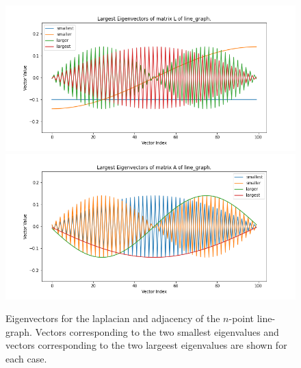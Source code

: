 \documentclass[12pt]{article}
\begin{document}
\begin{enumerate}[label=(\alph*)]
      \begin{figure}[!ht]
        \centering
        \includegraphics[scale=0.3]{figures/eigenvectors_line_graph_L.png}
        \includegraphics[scale=0.3]{figures/eigenvectors_line_graph_A.png}
        \caption{Eigenvectors for the laplacian and adjacency of the $n$-point line-graph. Vectors corresponding to the two smallest eigenvalues and vectors corresponding to the two largeest eigenvalues are shown for each case.}
        \label{fig:line_graph}
      \end{figure}


\end{enumerate}
\end{document}

